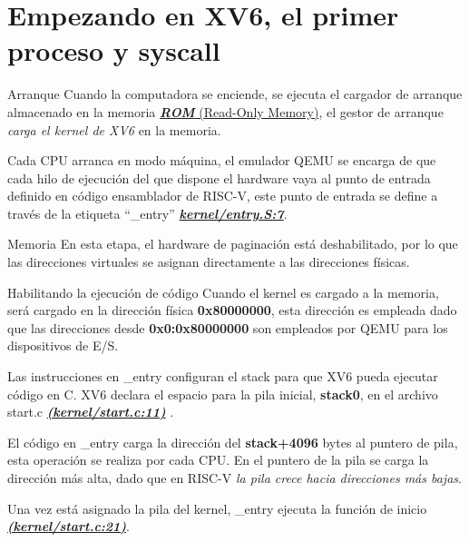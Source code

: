 \documentclass{libs/ufc_format}
\begin{document}
\section{Empezando en XV6, el primer proceso y syscall}
\begin{frame}{Arranque}
    Cuando la computadora se enciende, se ejecuta el cargador de arranque almacenado en la memoria \href{https://en.wikipedia.org/wiki/Read-only_memory}{\textit{\textbf{ROM}} (Read-Only Memory)}, el gestor de arranque \emph{carga el kernel de XV6} en la memoria.

    \vspace{0.3cm}

    Cada CPU arranca en modo máquina, el emulador QEMU se encarga de que cada hilo de ejecución del que dispone el hardware vaya al punto de entrada definido en código ensamblador de RISC-V, este punto de entrada se define a través de la etiqueta “\_entry” \href{https://github.com/CarlosSandoval-03/xv6-riscv/blob/riscv/kernel/entry.S\#L7}{\textit{\textbf{kernel/entry.S:7}}}.

    \vspace{0.1cm}

    \begin{block}{Memoria}
        En esta etapa, el hardware de paginación está deshabilitado, por lo que las direcciones virtuales se asignan directamente a las direcciones físicas.
    \end{block}
\end{frame}
\begin{frame}{Habilitando la ejecución de código}
    Cuando el kernel es cargado a la memoria, será cargado en la dirección física \textbf{0x80000000}, esta dirección es empleada dado que las direcciones desde \textbf{0x0:0x80000000} son empleados por QEMU para los dispositivos de E/S. \cite{xv6_book} \newline

    \vspace{0.3cm}

    Las instrucciones en \_entry configuran el stack para que XV6 pueda ejecutar código en C. XV6 declara el espacio para la pila inicial, \textbf{stack0}, en el archivo start.c \href{https://github.com/CarlosSandoval-03/xv6-riscv/blob/riscv/kernel/start.c\#L11}{\textit{\textbf{(kernel/start.c:11)}}} \cite{xv6_book}. 
\end{frame}
\begin{frame}{}
    El código en \_entry carga la dirección del \textbf{stack+4096} bytes al puntero de pila, esta operación se realiza por cada CPU. En el puntero de la pila se carga la dirección más alta, dado que en RISC-V \emph{la pila crece hacia direcciones más bajas}.\newline
    
    \vspace{0.3cm}
    
    Una vez está asignado la pila del kernel, \_entry ejecuta la función de inicio \href{https://github.com/CarlosSandoval-03/xv6-riscv/blob/riscv/kernel/start.c\#L21}{\textbf{\textit{(kernel/start.c:21)}}}. \cite{xv6_book}
\end{frame}
\end{document}

